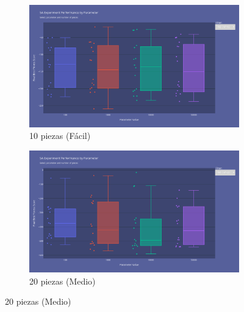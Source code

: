 \documentclass[11pt,spanish,listoffigures,listoftables]{tfgetsinf}
\begin{document}
\begin{figure}[H]
    \centering
    \begin{subfigure}[b]{0.48\textwidth}
        \centering
        \includegraphics[width=\textwidth]{images/SA_np-10_tabu.png}
        \caption{10 piezas (Fácil)}
        \label{fig:sa_np10_tabu}
    \end{subfigure}
    \hfill
    \begin{subfigure}[b]{0.48\textwidth}
        \centering
        \includegraphics[width=\textwidth]{images/SA_np-20_tabu.png}
        \caption{20 piezas (Medio)}
        \label{fig:sa_np20_tabu}
    \end{subfigure}
    
    \vspace{0.5cm}
    

\end{figure}
\end{document}
